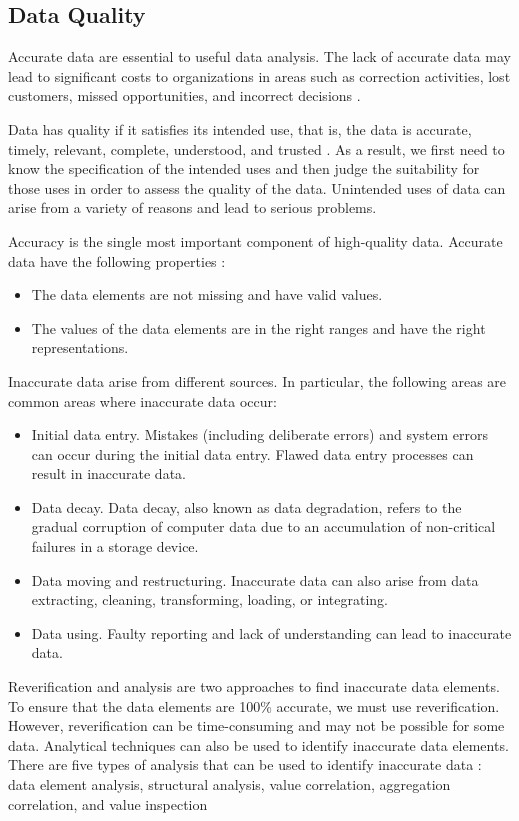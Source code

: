 \documentclass[12pt]{article}
\begin{document}
\subsection{Data Quality}

Accurate data are essential to useful data analysis. The lack of accurate data may lead to significant costs to organizations in areas such as correction activities, lost customers, missed opportunities, and incorrect decisions \citep{olson2003}.

Data has quality if it satisfies its intended use, that is, the data is accurate, timely, relevant, complete, understood, and trusted \citep{olson2003}. As a result, we first need to know the specification of the intended uses and then judge the suitability for those uses in order to assess the quality of the data. Unintended uses of data can arise from a variety of reasons and lead to serious problems. 

Accuracy is the single most important component of high-quality data. Accurate data have the following properties \citep{olson2003}:
\begin{itemize}
\item The data elements are not missing and have  valid values.
\item The values of the data elements are in the right ranges and have the right representations.
\end{itemize}
Inaccurate data arise from different sources. In particular, the following areas are common areas where inaccurate data occur:
\begin{itemize}
\item Initial data entry. Mistakes (including deliberate errors) and system errors can occur during the initial data entry. Flawed data entry processes can result in inaccurate data.
\item Data decay. Data decay, also known as data degradation, refers to the gradual corruption of computer data due to an accumulation of non-critical failures in a storage device.
\item Data moving and restructuring. Inaccurate data can also arise from data extracting, cleaning, transforming, loading, or integrating.
\item Data using. Faulty reporting and lack of understanding can lead to inaccurate data.
\end{itemize}

Reverification and analysis are two approaches to find inaccurate data elements. To ensure that the data elements are 100\% accurate, we must use reverification. However, reverification can be time-consuming and may not be possible for some data. Analytical techniques can also be used to identify inaccurate data elements. There are five types of analysis that can be used to  identify inaccurate data \citep{olson2003}: data element analysis, structural analysis, value correlation, aggregation correlation, and value inspection
\end{document}

